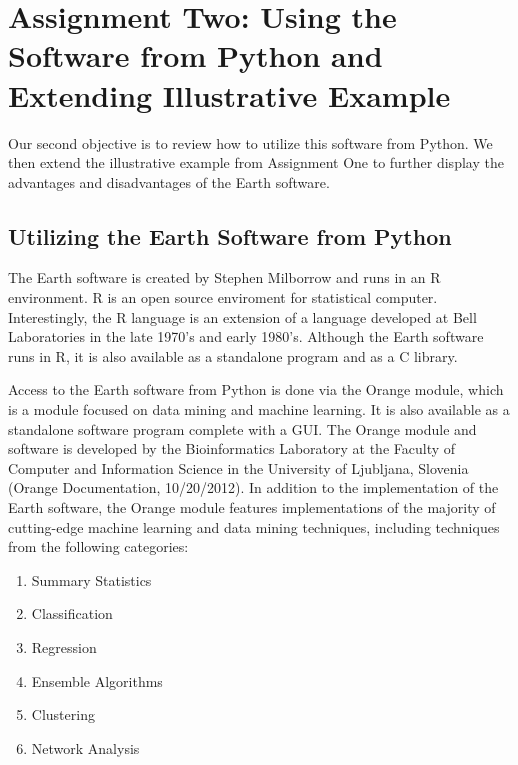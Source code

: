 

\graphicspath{{C:/Documents and Settings/amcelhinney/My Documents/GitHub/MCS507ProjectTwo/tex/include/}}

\section{Assignment Two: Using the Software from Python and Extending Illustrative Example} %
\label{sec: First}
Our second objective is to review how to utilize this software from Python. We then extend the illustrative example from Assignment One to further display the advantages and disadvantages of the Earth software.

\subsection{Utilizing the Earth Software from Python} %
\label{sub:methoda}
The Earth software is created by Stephen Milborrow and runs in an R environment. R is an open source enviroment for statistical computer. Interestingly, the R language is an extension of a language developed at Bell Laboratories in the late 1970's and early 1980's. Although the Earth software runs in R, it is also available as a standalone program and as a C library. 

Access to the Earth software from Python is done via the Orange module, which is a module focused on data mining and machine learning. It is also available as a standalone software program complete with a GUI. The Orange module and software is developed by the Bioinformatics Laboratory at the Faculty of Computer and Information Science in the University of Ljubljana, Slovenia (Orange Documentation, 10/20/2012). In addition to the implementation of the Earth software, the Orange module features implementations of the majority of cutting-edge machine learning and data mining techniques, including techniques from the following categories:

\begin{enumerate}
\item Summary Statistics
\item Classification
\item Regression
\item Ensemble Algorithms
\item Clustering
\item Network Analysis
\end{enumerate}


